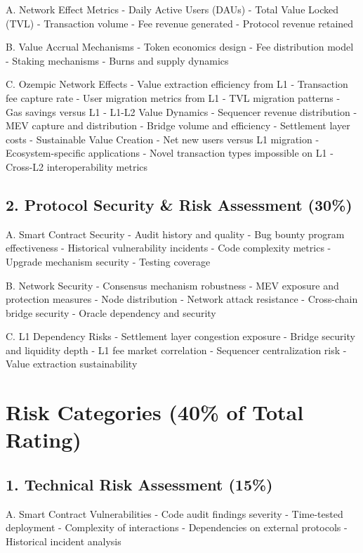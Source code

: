 \documentclass[
  letterpaper,
  DIV=11,
  numbers=noendperiod]{scrreprt}
\begin{document}
A. Network Effect Metrics - Daily Active Users (DAUs) - Total Value
Locked (TVL) - Transaction volume - Fee revenue generated - Protocol
revenue retained

B. Value Accrual Mechanisms - Token economics design - Fee distribution
model - Staking mechanisms - Burns and supply dynamics

C. Ozempic Network Effects - Value extraction efficiency from L1 -
Transaction fee capture rate - User migration metrics from L1 - TVL
migration patterns - Gas savings versus L1 - L1-L2 Value Dynamics -
Sequencer revenue distribution - MEV capture and distribution - Bridge
volume and efficiency - Settlement layer costs - Sustainable Value
Creation - Net new users versus L1 migration - Ecosystem-specific
applications - Novel transaction types impossible on L1 - Cross-L2
interoperability metrics

\subsection{2. Protocol Security \& Risk Assessment
(30\%)}\label{protocol-security-risk-assessment-30}

A. Smart Contract Security - Audit history and quality - Bug bounty
program effectiveness - Historical vulnerability incidents - Code
complexity metrics - Upgrade mechanism security - Testing coverage

B. Network Security - Consensus mechanism robustness - MEV exposure and
protection measures - Node distribution - Network attack resistance -
Cross-chain bridge security - Oracle dependency and security

C. L1 Dependency Risks - Settlement layer congestion exposure - Bridge
security and liquidity depth - L1 fee market correlation - Sequencer
centralization risk - Value extraction sustainability

\section{Risk Categories (40\% of Total
Rating)}\label{risk-categories-40-of-total-rating}

\subsection{1. Technical Risk Assessment
(15\%)}\label{technical-risk-assessment-15}

A. Smart Contract Vulnerabilities - Code audit findings severity -
Time-tested deployment - Complexity of interactions - Dependencies on
external protocols - Historical incident analysis
\end{document}
